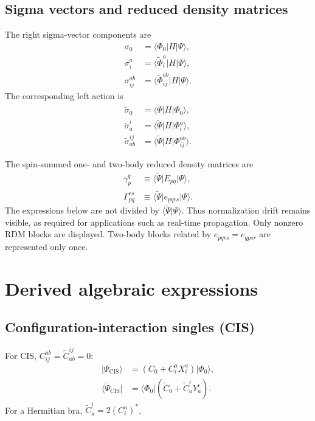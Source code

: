 \documentclass[10pt]{article}
\newcommand{\vac}{\Phi_0}
\newcommand{\tC}{\widetilde{C}}
\newcommand{\tPhi}{\widetilde{\Phi}}
\newcommand{\tPsi}{\widetilde{\Psi}}
\newcommand{\tsigma}{\widetilde{\sigma}}
\begin{document}
\subsection{Sigma vectors and reduced density matrices}

The right sigma-vector components are
\begin{align}
 \sigma_0
 &=\langle\vac\rvert H\lvert\Psi\rangle,
 \\
 \sigma_i^a
 &=\langle\tPhi_i^a\rvert H\lvert\Psi\rangle,
 \\
 \sigma_{ij}^{ab}
 &=\langle\tPhi_{ij}^{ab}\rvert H\lvert\Psi\rangle.
\end{align}
The corresponding left action is
\begin{align}
 \tsigma_0
 &=\langle\tPsi\rvert H\lvert\vac\rangle,
 \\
 \tsigma_a^i
 &=\langle\tPsi\rvert H\lvert\Phi_i^a\rangle,
 \\
 \tsigma_{ab}^{ij}
 &=\langle\tPsi\rvert H\lvert\Phi_{ij}^{ab}\rangle.
\end{align}

The spin-summed one- and two-body reduced density matrices are
\begin{align}
 \gamma_p^q
 &\equiv\langle\tPsi\rvert E_{pq}\lvert\Psi\rangle,
 \\
 \Gamma_{pq}^{rs}
 &\equiv\langle\tPsi\rvert e_{pqrs}\lvert\Psi\rangle.
\end{align}
The expressions below are not divided by
$\langle\tPsi\vert\Psi\rangle$. Thus normalization drift remains visible,
as required for applications such as real-time propagation. Only nonzero RDM
blocks are displayed. Two-body blocks related by
$e_{pqrs}=e_{qpsr}$ are represented only once.

\section{Derived algebraic expressions}

\subsection{Configuration-interaction singles (CIS)}

For CIS, $C_{ij}^{ab}=\tC_{ab}^{ij}=0$:
\begin{align}
 \lvert\Psi_{\mathrm{CIS}}\rangle
 &=\left(C_0+C_i^aX_i^a\right)\lvert\vac\rangle,
 \\
 \langle\tPsi_{\mathrm{CIS}}\rvert
 &=\langle\vac\rvert\left(\tC_0+\tC_a^iY_a^i\right).
\end{align}
For a Hermitian bra, $\tC_a^i=2(C_i^a)^*$.
\end{document}
